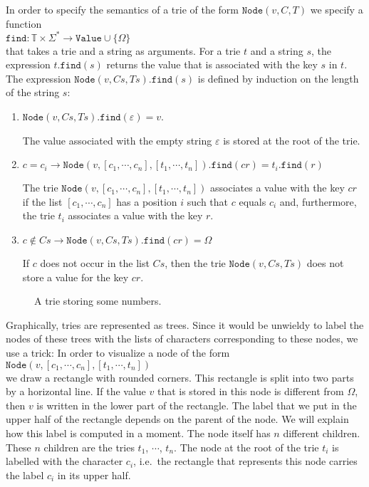 In order to specify the semantics of a trie of the form $\texttt{Node}(v,C,T)$ 
we specify a function
\\[0.2cm]
\hspace*{1.3cm} 
$\texttt{find}: \mathbb{T} \times \Sigma^* \rightarrow \texttt{Value} \cup \{ \Omega\}$
\\[0.2cm]
that takes a trie and a string as arguments.  For a trie $t$ and a string $s$, the expression $t.\texttt{find}(s)$ returns the
value that is associated with the key $s$ in $t$.  The expression
$\texttt{Node}(v,C\!s,T\!s).\texttt{find}(s)$ is defined by induction on the length of the  string $s$:
\begin{enumerate}
\item $\texttt{Node}(v, C\!s, T\!s).\texttt{find}(\varepsilon) = v$.

      The value associated with the empty string $\varepsilon$ is stored at the root of the trie.
\item $c = c_i \rightarrow 
       \texttt{Node}(v, [c_1, \cdots, c_n], [t_1, \cdots, t_n]).\texttt{find}(cr) = t_i.\texttt{find}(r)
      $

      The trie $\texttt{Node}(v, [c_1, \cdots, c_n], [t_1, \cdots, t_n])$ associates a value with
      the key $cr$ if the list $[c_1, \cdots, c_n]$ has a position $i$ such that $c$ equals $c_i$
      and, furthermore, the trie  $t_i$ associates a value with the key  $r$.
\item $ c \not\in C\!s \rightarrow
       \texttt{Node}(v, C\!s, T\!s).\texttt{find}(cr) = \Omega
      $

      If $c$ does not occur in the list $C\!s$, then the trie $\texttt{Node}(v, C\!s, T\!s)$ does not store a value for
      the key $cr$.
\end{enumerate}

\begin{figure}[!ht]
  \centering
  \caption{A trie storing some numbers.}
  \label{fig:trie}
\end{figure}

Graphically, tries are represented as trees.  Since it would be unwieldy to label the nodes of these
trees with the lists of characters corresponding to these nodes, we use a trick:  In order to
visualize a node of the form \\[0.2cm]
\hspace*{1.3cm} 
$\texttt{Node}(v, [c_1, \cdots, c_n], [t_1, \cdots, t_n])$ \\[0.2cm]
we draw a rectangle with rounded corners.  This rectangle is split into two parts by a horizontal line.
If the value  $v$ that is stored in this node is different from $\Omega$, then $v$ is
written in the lower part of the rectangle.  The label that we put in the upper half of the rectangle
depends on the parent of the node.  We will explain how this label is computed in a moment.
The node itself has $n$ different children.  These $n$ children are the tries
$t_1$, $\cdots$, $t_n$.  The node at the root of the trie $t_i$ is labelled with the character $c_i$,
i.e.~the rectangle that represents this node carries the label $c_i$ in its upper half.

